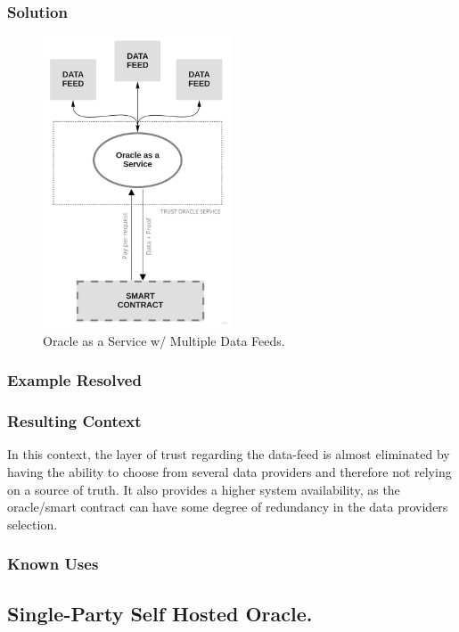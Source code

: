 \subsubsection{Solution}
\begin{figure}[t]
  \begin{center}
    \leavevmode
    \includegraphics[width=0.5\textwidth]{figures/oraclearch2.jpg}
    \caption{Oracle as a Service w/ Multiple Data Feeds.}
    \label{fig:/figures/paper-screening}
  \end{center}
\end{figure}

\subsubsection{Example Resolved}
\subsubsection{Resulting Context}
In this context, the layer of trust regarding the data-feed is almost eliminated by having the ability to choose from several data providers and therefore not relying on a source of truth. It also provides a higher system availability, as the oracle/smart contract can have some degree of redundancy in the data providers selection.

\subsubsection{Known Uses}

\subsection{Single-Party Self Hosted Oracle.}

